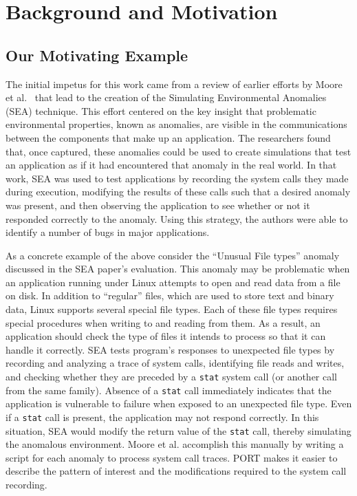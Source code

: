 \section{Background and Motivation}
\label{SEC:background}


\subsection{Our Motivating Example}
\label{sec:MotivatingExample}

The initial impetus for this work came from a review
of earlier efforts by Moore et al.~\cite{DBLP:conf/issre/MooreCFW19}
that lead to the creation of
the Simulating Environmental Anomalies (SEA) technique.
This effort centered on the key insight
that problematic
environmental properties,
known as anomalies, are visible in the
communications between the components that make up an application.
The researchers found that,
once captured,
these anomalies
could be
used to create simulations
that test
an application as if
it had encountered that anomaly
in the real world.
In that work, SEA was used to test applications
by recording the system calls they made
during execution,
modifying the results of these calls such that a desired anomaly
was present,
and then observing the application to see whether or not it
responded correctly to the anomaly.
Using this strategy, the authors were able to identify a number of bugs
in major applications.

As a concrete example of the above
consider the ``Unusual File types'' anomaly
discussed in the SEA paper's evaluation.
This anomaly may be problematic
when an application running under Linux
attempts to open and read data from a file on disk.
In addition to ``regular'' files,
which are used to store text and
binary data,
Linux supports several special file types.
Each of these file types requires special procedures when writing to and
reading from them.
As a result, an application should check the type of files it intends to
process so that it can handle it correctly.
SEA tests program's responses
to unexpected file types
by recording and analyzing a trace of system calls,
identifying file reads and writes,
and checking whether they are preceded by a {\tt stat}
system call (or another call from the same family).
Absence of a {\tt stat} call
immediately indicates
that the application is vulnerable
to failure
when exposed to an unexpected file type.
Even if a {\tt stat} call is present,
the application may not respond correctly.
In this situation,
SEA would
modify
the return value
of the {\tt stat} call,
thereby simulating the anomalous environment.
Moore et al. accomplish this manually
by writing a script
for each anomaly
to process system call traces.
PORT makes it easier to describe
the pattern of interest
and the  modifications required
to the system call recording.

